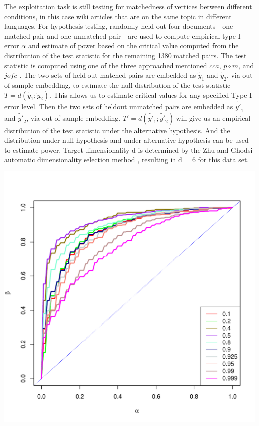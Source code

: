 \documentclass[11pt]{article} %
\begin{document}
The exploitation task is still testing for matchedness of vertices between different conditions, in this case wiki articles that are on the same topic  in  different languages.
For hypothesis testing,   randomly held out four documents - one matched pair and one unmatched pair
 -  are used to compute empirical type I error $\alpha$ and estimate of power based on the critical value computed
  from the distribution of the test statistic for the remaining 1380 matched pairs. 
The test statistic is computed using one of the three approached mentioned  $cca$, $p\circ m$, and $jofc$ . 
The two sets of held-out matched pairs are embedded as $\tilde{y}_1$ and $\tilde{y}_2$, via out-of-sample
embedding, to estimate the null distribution of the test statistic $T = d(\tilde{y}_1; \tilde{y}_2)$. This allows
us to estimate critical values for any specified Type I error level. 
Then the two sets of heldout unmatched pairs are embedded as $\tilde{y'}_1$ and $\tilde{y'}_2$, via out-of-sample embedding. 
$T' = d(\tilde{y'}_1; \tilde{y'}_2)$ will give us an empirical distribution of the test statistic  under the alternative hypothesis. 
And the distribution under null hypothesis and under alternative hypothesis can be used to estimate power.
Target dimensionality d is determined by the Zhu and Ghodsi  automatic dimensionality selection
method \cite{ZhuGhodsi}, resulting in d = 6 for this data set.


\includegraphics{graphs/FidCommPaperwiki-two-cond-plot} 
\end{document}

